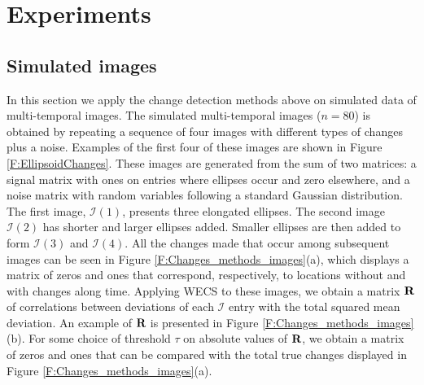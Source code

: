 \documentclass[journal]{IEEEtran}
\newcommand{\vR}{{\textbf R}}
\begin{document}
\section{Experiments}

\subsection{Simulated images}
\label{section_validation}

In this section we apply the change detection methods above on simulated data of multi-temporal images. The simulated multi-temporal images ($n=80$) is obtained by repeating a sequence of four images with different types of changes plus a noise. Examples of the first four of these images are shown in Figure \ref{F:EllipsoidChanges}. These images are generated from the sum of two matrices: a signal matrix with ones on entries where ellipses occur and zero elsewhere, and a noise matrix with random variables following a standard Gaussian distribution. The first image, $\mathcal{I}(1)$, presents three elongated ellipses. The second image $\mathcal{I}(2)$ has shorter and larger ellipses added. Smaller ellipses are then added to form $\mathcal{I}(3)$ and $\mathcal{I}(4)$. All the changes made that occur among subsequent images can be seen in Figure \ref{F:Changes_methods_images}(a), which displays a matrix of zeros and ones that correspond, respectively, to locations without and with changes along time. Applying WECS to these images, we obtain a matrix $\vR$ of correlations between deviations of each $\mathcal{I}$ entry with the total squared mean deviation. An example of $\vR$ is presented in Figure \ref{F:Changes_methods_images}(b). For some choice of threshold $\tau$ on absolute values of $\vR$, we obtain a matrix of zeros and ones that can be compared with the total true changes displayed in Figure \ref{F:Changes_methods_images}(a).
\end{document}
